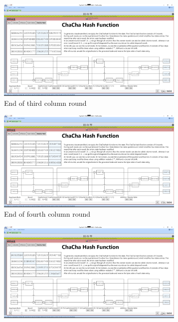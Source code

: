 \begin{figure}
\begin{subfigure}{0.5\textwidth}
  \centering
  \includegraphics[width=0.99\textwidth]{figures/ct2/chachahash/chachahash-cr3-end.png}
  \caption{End of third column round}
  \label{fig:chachahash.cr.3}
\end{subfigure}%
\begin{subfigure}{0.5\textwidth}
  \centering
  \includegraphics[width=0.99\textwidth]{figures/ct2/chachahash/chachahash-cr4-end.png}
  \caption{End of fourth column round}
  \label{fig:chachahash.cr.4}
\end{subfigure}
\caption[End of column rounds]{End of quarterround execution of each column round of an uneven round \\(here: round 1)}
\label{fig:chachahash.cr}
\centering
\begin{subfigure}{0.5\textwidth}
  \centering
  \includegraphics[width=0.99\textwidth]{figures/ct2/chachahash/chachahash-dr1-end.png}

\end{subfigure}
\end{figure}
